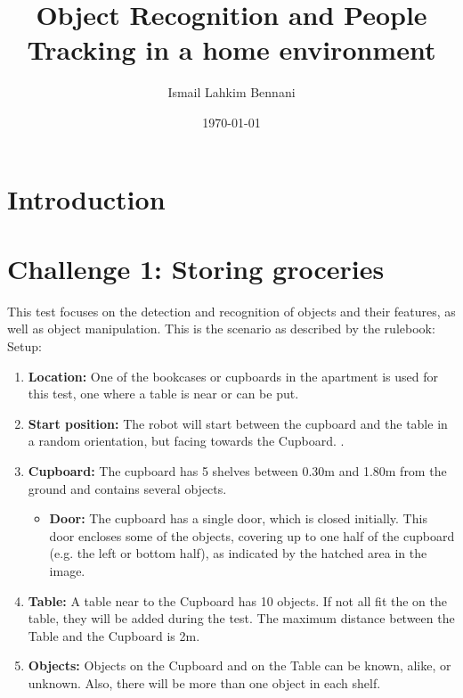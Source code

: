\documentclass[a4paper, twocolumn]{article}
\title{Object Recognition and People Tracking in a home environment}
\author{Ismail Lahkim Bennani}
\date{\today}
\begin{document}
    \twocolumn[{\begin{@twocolumnfalse}
		\maketitle
        \tableofcontents

        \vspace{2em}
	\end{@twocolumnfalse}}]

    \section*{Introduction}
    
    

    \section{Challenge 1: Storing groceries}

        This test focuses on the detection and recognition of objects and their features, as well as object manipulation. This is the scenario as described by the rulebook:\\

    Setup:
    \begin{enumerate}
    	\item \textbf{Location:} One of the bookcases or cupboards in the apartment is used for this test, one where a table is near or can be put.
    	\item \textbf{Start position:} The robot will start between the cupboard and the table in a random orientation, but facing towards the Cupboard.
    	.
    	\item \textbf{Cupboard:} The cupboard has 5 shelves between 0.30m and 1.80m from the ground and contains several objects.
    	\begin{itemize}
    	 	\item \textbf{Door:} The cupboard has a single door, which is closed initially.
    	 	This door encloses some of the objects, covering up to one half of the cupboard (e.g. the left or bottom half), as indicated by the hatched area in the image.
    	\end{itemize}
    	\item \textbf{Table:} A table near to the Cupboard has 10 objects. If not all fit the on the table, they will be added during the test. The maximum distance between the Table and the Cupboard is 2m.
    	\item \textbf{Objects:} Objects on the Cupboard and on the Table can be known, alike, or unknown. Also, there will be more than one object in each shelf.
    \end{enumerate}
\end{document}
